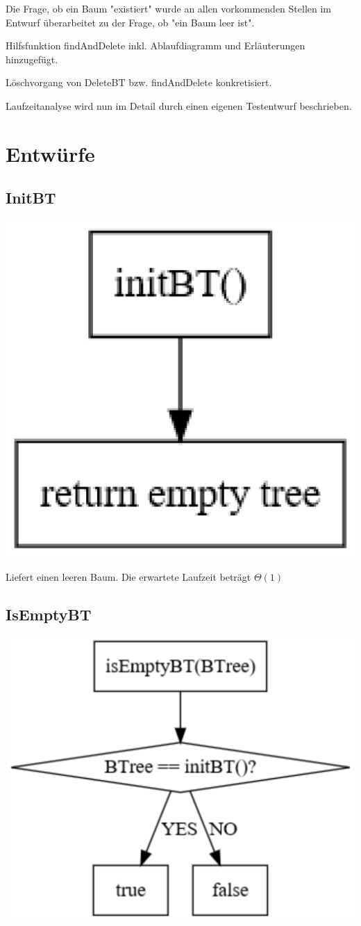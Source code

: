 \documentclass[11pt]{article}
\begin{document}
    Die Frage, ob ein Baum "existiert" wurde an allen vorkommenden Stellen im Entwurf überarbeitet zu der Frage, ob "ein Baum leer ist".
    
    Hilfsfunktion findAndDelete inkl. Ablaufdiagramm und Erläuterungen hinzugefügt.
    
    Löschvorgang von DeleteBT bzw. findAndDelete konkretisiert.
    
    Laufzeitanalyse wird nun im Detail durch einen eigenen Testentwurf beschrieben.


    \section{Entwürfe}\label{sec:entwuerfe}

    \subsection{InitBT}\label{subsec:initbt}
    
    \begin{center}
        \includegraphics[width=0.2\columnwidth] {init.pdf}
    \end{center}
    
    Liefert einen leeren Baum.
    Die erwartete Laufzeit beträgt
    \begin{math}
        \Theta(1)
    \end{math}

    \subsection{IsEmptyBT}\label{subsec:isemptybt}
    
    \begin{center}
        \includegraphics[width=0.39\columnwidth] {isempty.pdf}
    \end{center}
    
\end{document}
